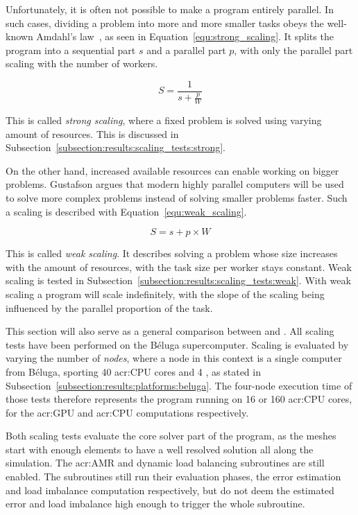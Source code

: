 Unfortunately, it is often not possible to make a program entirely parallel. In such cases, dividing
a problem into more and more smaller tasks obeys the well-known Amdahl's law~\cite{Amdahl1967}, as
seen in Equation~\ref{equ:strong_scaling}. It splits the program into a sequential part $s$ and a parallel
part $p$, with only the parallel part scaling with the number of workers.

\begin{equation} \label{equ:strong_scaling}
	S = \frac{1}{s + \frac{p}{W}}
\end{equation}

This is called \textit{strong scaling}, where a fixed problem is solved using varying amount of
resources. This is discussed in Subsection~\ref{subsection:results:scaling_tests:strong}.

On the other hand, increased available resources can enable working on bigger problems. Gustafson
argues that modern highly parallel computers will be used to solve more complex problems instead of
solving smaller problems faster. Such a scaling is described with Equation~\ref{equ:weak_scaling}.

\begin{equation} \label{equ:weak_scaling}
	S = s + p \times W
\end{equation}

This is called \textit{weak scaling}. It describes solving a problem whose size increases with the
amount of resources, with the task size per worker stays constant. Weak scaling is tested in
Subsection~\ref{subsection:results:scaling_tests:weak}. With weak scaling a program will scale
indefinitely, with the slope of the scaling being influenced by the parallel proportion of the task.

This section will also serve as a general comparison between  and
. All scaling tests have been performed on the Béluga supercomputer. Scaling is
evaluated by varying the number of \textit{nodes}, where a node in this context is a single computer
from Béluga, sporting 40 \acrshort{acr:CPU} cores and 4 , as stated in
Subsection~\ref{subsection:results:platforms:beluga}. The four-node execution time of those tests
therefore represents the program running on 16  or 160 \acrshort{acr:CPU} cores,
for the \acrshort{acr:GPU} and \acrshort{acr:CPU} computations respectively.

Both scaling tests evaluate the core solver part of the program, as the meshes start with enough
elements to have a well resolved solution all along the simulation. The \acrlong{acr:AMR} and
dynamic load balancing subroutines are still enabled. The subroutines still run their evaluation
phases, the error estimation and load imbalance computation respectively, but do not deem the
estimated error and load imbalance high enough to trigger the whole subroutine. 

